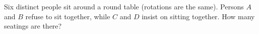 Six distinct people sit around a round table (rotations are the same). Persons $A$ and $B$ refuse to sit together, while $C$ and $D$ insist on sitting together. How many seatings are there?
